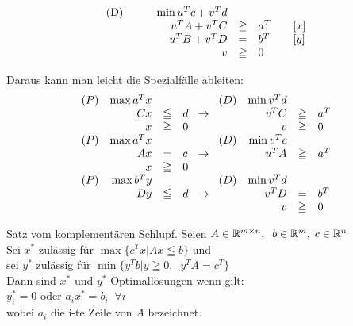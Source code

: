 \[\begin{array}{rcl@{\hspace{7mm}}l}
\mbox{(D)}\hspace{10mm} \min u^{T}c + v^{T} d\\
u^{T}A+v^{T} C &\geqq& a^{T}&[x]\\
u^{T}B + v^{T}D &=& b^{T}&[y]\\
v&\geqq& 0
\end{array}\]

Daraus kann man leicht die Spezialfälle ableiten:
\[\begin{array}{lrcl@{\hspace{3mm}}c@{\hspace{3mm}}lrcl}
(P)&\max a^{T}x&&&&(D)& \min v^{T}d\\
&C x &\leqq& d & \rightarrow&& v^{T}C &\geqq& a^{T}\\
&x &\geqq&0&&&v &\geqq& 0\\
(P)&\max a^{T}x&&&&(D)& \min v^{T}c\\
&A x &=& c & \rightarrow&& u^{T}A &\geqq& a^{T}\\
&x &\geqq&0\\
(P)&\max b^{T}y&&&&(D)& \min v^{T}d\\
&D y &\leqq& d & \rightarrow&& v^{T}D &=& b^{T}\\
&&&&&&v &\geqq& 0
\end{array}\]

\begin{satz} \label{KomplSchl}
Satz vom komplementären Schlupf.
Seien $A \in \mathbb{R}^{m\times n},\;\; b \in \mathbb{R}^{m},\; c \in \mathbb{R}^{n}$\\
Sei $x^{\ast}$ zulässig für $\max \{c^{T}x | A x \leqq b\}$ und\\
sei $y^{\ast}$ zulässig für $\min \{y^{T}b|y\geqq 0, \;\; y^{T}A= c^{T}\}$\\
Dann sind $x^{\ast}$ und $y^{\ast}$ Optimallösungen wenn gilt:\\
$y_{i}^{\ast} = 0$ oder $a_{i} x^{\ast} = b_{i} \; \; \forall i$\\
wobei $a_{i}$ die i-te Zeile von $A$ bezeichnet. 
\end{satz}


